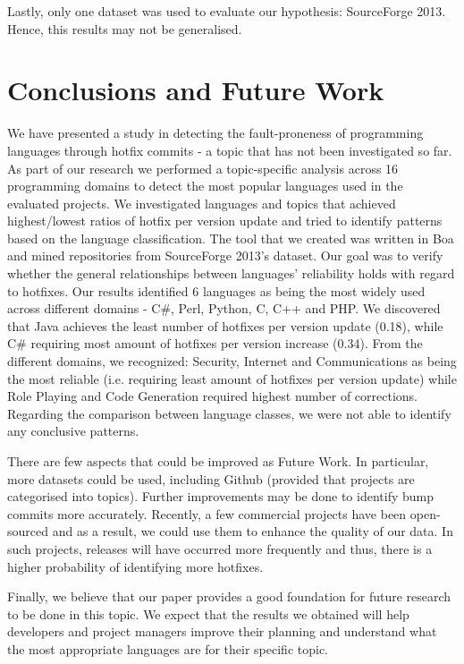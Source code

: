 \documentclass{sig-alternate}
\begin{document}
Lastly, only one dataset was used to evaluate our hypothesis: SourceForge 2013. Hence, this results may not be generalised.

\section{Conclusions and Future Work}
We have presented a study in detecting the fault-proneness of programming languages through hotfix commits - a topic that has not been investigated so far. As part of our research we performed a topic-specific analysis across 16 programming domains to detect the most popular languages used in the evaluated  projects. We investigated languages and topics that achieved highest/lowest ratios of hotfix per version update and tried to identify patterns based on the language classification. The tool that we created was written in Boa and mined repositories from SourceForge 2013's dataset. Our goal was to verify whether the general relationships between languages' reliability holds with regard to hotfixes.  
Our results identified 6 languages as being the most widely used across different domains - C\#, Perl, Python, C, C++ and PHP. We discovered that Java achieves the least number of hotfixes per version update (0.18), while C\# requiring most amount of hotfixes per version increase (0.34). From the different domains, we recognized: Security, Internet and Communications as being the most reliable (i.e. requiring least amount of hotfixes per version update) while Role Playing and Code Generation required highest number of corrections. Regarding the comparison between language classes, we were not able to identify any conclusive patterns.\par
There are few aspects that could be improved as Future Work. In particular, more datasets could be used, including Github (provided that projects are categorised into topics). Further improvements may be done to identify bump commits more accurately. Recently, a few commercial projects have been open-sourced and as a result, we could use them to enhance the quality of our data. In such projects, releases will have occurred more frequently and thus, there is a higher probability of identifying more hotfixes.\par
Finally, we believe that our paper provides a good foundation for future research to be done in this topic. We expect that the results we obtained will help developers and project managers improve their planning and understand what the most appropriate languages are for their specific topic.
\end{document}
